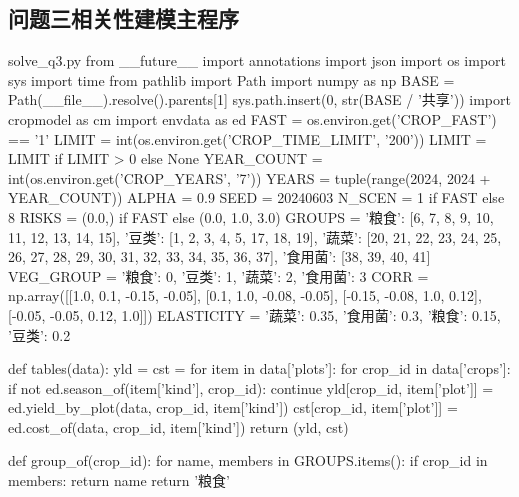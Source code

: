 \documentclass[bwprint]{gmcmthesis}
\begin{document}
\begin{appendices}
\subsection{问题三相关性建模主程序}


\begin{Python}{solve\_q3.py}
from __future__ import annotations
import json
import os
import sys
import time
from pathlib import Path
import numpy as np
BASE = Path(__file__).resolve().parents[1]
sys.path.insert(0, str(BASE / '共享'))
import cropmodel as cm
import envdata as ed
FAST = os.environ.get('CROP_FAST') == '1'
LIMIT = int(os.environ.get('CROP_TIME_LIMIT', '200'))
LIMIT = LIMIT if LIMIT > 0 else None
YEAR_COUNT = int(os.environ.get('CROP_YEARS', '7'))
YEARS = tuple(range(2024, 2024 + YEAR_COUNT))
ALPHA = 0.9
SEED = 20240603
N_SCEN = 1 if FAST else 8
RISKS = (0.0,) if FAST else (0.0, 1.0, 3.0)
GROUPS = {'粮食': [6, 7, 8, 9, 10, 11, 12, 13, 14, 15], '豆类': [1, 2, 3, 4, 5, 17, 18, 19], '蔬菜': [20, 21, 22, 23, 24, 25, 26, 27, 28, 29, 30, 31, 32, 33, 34, 35, 36, 37], '食用菌': [38, 39, 40, 41]}
VEG_GROUP = {'粮食': 0, '豆类': 1, '蔬菜': 2, '食用菌': 3}
CORR = np.array([[1.0, 0.1, -0.15, -0.05], [0.1, 1.0, -0.08, -0.05], [-0.15, -0.08, 1.0, 0.12], [-0.05, -0.05, 0.12, 1.0]])
ELASTICITY = {'蔬菜': 0.35, '食用菌': 0.3, '粮食': 0.15, '豆类': 0.2}

def tables(data):
    yld = {}
    cst = {}
    for item in data['plots']:
        for crop_id in data['crops']:
            if not ed.season_of(item['kind'], crop_id):
                continue
            yld[crop_id, item['plot']] = ed.yield_by_plot(data, crop_id, item['kind'])
            cst[crop_id, item['plot']] = ed.cost_of(data, crop_id, item['kind'])
    return (yld, cst)

def group_of(crop_id):
    for name, members in GROUPS.items():
        if crop_id in members:
            return name
    return '粮食'


\end{Python}
\end{appendices}
\end{document}

